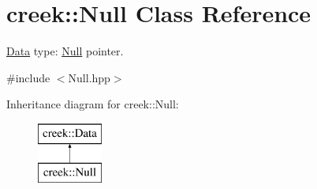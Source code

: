 \hypertarget{classcreek_1_1_null}{}\section{creek\+:\+:Null Class Reference}
\label{classcreek_1_1_null}


\hyperlink{classcreek_1_1_data}{Data} type\+: \hyperlink{classcreek_1_1_null}{Null} pointer.  




{\ttfamily \#include $<$Null.\+hpp$>$}

Inheritance diagram for creek\+:\+:Null\+:\begin{figure}[H]
\begin{center}
\leavevmode
\includegraphics[height=2.000000cm]{classcreek_1_1_null}
\end{center}
\end{figure}
